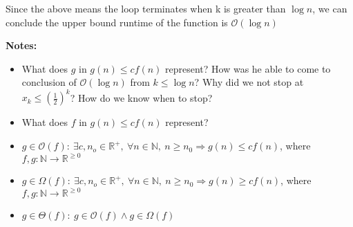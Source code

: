 \documentclass[12pt]{article}
\begin{document}
\begin{enumerate}[a.]
    Since the above means the loop terminates when k is greater than $\log n$,
    we can conclude the upper bound runtime of the function is $\mathcal{O}(\log n)$

    \bigskip

    \textbf{Notes:}

    \begin{itemize}
        \item

        What does $g$ in $g(n) \leq cf(n)$ represent? How was he able to come to
        conclusion of $\mathcal{O}(\log n)$ from $k \leq \log n$? Why did we not
        stop at $x_k \leq (\frac{1}{2})^k$? How do we know when to stop?

        \item

        What does $f$ in $g(n) \leq cf(n)$ represent?

        \item

        $g \in \mathcal{O}(f):\:\exists c,n_o \in \mathbb{R}^{+},\:\forall n \in
        \mathbb{N},\:n \geq n_0 \Rightarrow g(n) \leq cf(n)$, where $f,g:\mathbb{N} \to \mathbb{R}^{\geq 0}$

        \item

        $g \in \Omega(f):\:\exists c,n_o \in \mathbb{R}^{+},\:\forall n \in
        \mathbb{N},\:n \geq n_0 \Rightarrow g(n) \geq cf(n)$, where $f,g:\mathbb{N} \to \mathbb{R}^{\geq 0}$

        \item

        $g \in \Theta(f):\: g \in \mathcal{O}(f) \land g \in \Omega(f)$
    \end{itemize}

\end{enumerate}
\end{document}
